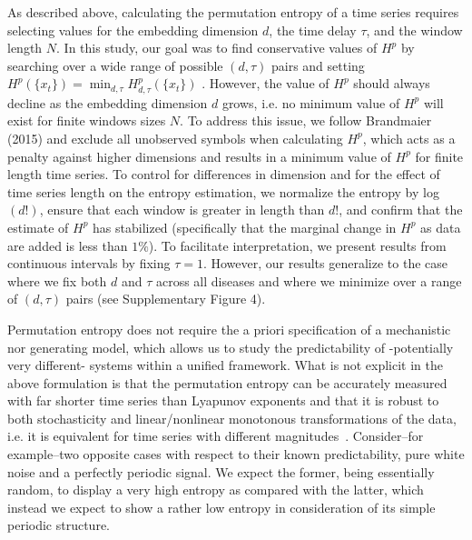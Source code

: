 \documentclass[fleqn,12pt]{wlscirep}
\begin{document}
As described above, calculating the permutation entropy of a time series requires selecting values for the embedding dimension $d$, the time delay $\tau$, and the window length $N$. In this study, our goal was to find conservative values of $H^p$ by searching over a wide range of possible $(d,\tau)$ pairs and setting $H^p (\{ x_t\}) = \min_{d,\tau} H^p_{d,\tau}(\{ x_t\})$ . However, the value of $H^p$ should always decline as the embedding dimension $d$ grows, i.e. no minimum value of $H^p$ will exist for finite windows sizes $N$.  To address this issue, we follow Brandmaier (2015) \cite{brandmaier2015pdc} and exclude all unobserved symbols when calculating $H^p$, which acts as a penalty against higher dimensions and results in a minimum value of $H^p$ for finite length time series.  To control for differences in dimension and for the effect of time series length on the entropy estimation, we normalize the entropy by log$(d!)$, ensure that each window is greater in length than $d!$, and confirm that the estimate of $H^p$ has stabilized (specifically that the marginal change in $H^p$ as data are added is less than $1\%$). To facilitate interpretation, we present results from continuous intervals by fixing $\tau=1$.  However, our results generalize to the case where we fix both $d$ and $\tau$ across all diseases and where we minimize over a range of $(d,\tau)$ pairs (see Supplementary Figure 4).

Permutation entropy does not require the a priori specification of a mechanistic nor generating model, which allows us to study the predictability of -potentially very different- systems within a unified framework. What is not explicit in the above formulation is that the permutation entropy can be accurately measured with far shorter time series than Lyapunov exponents and that it is robust to both stochasticity and linear\slash nonlinear monotonous transformations of the data, i.e. it is equivalent for time series with different magnitudes~\cite{bandt2002permutation,zunino2012distinguishing}. Consider--for example--two opposite cases with respect to their known predictability, pure white noise and a perfectly periodic signal. We expect the former, being essentially random, to display a very high entropy as compared with the latter, which instead we expect to show a rather low entropy in consideration of its simple periodic structure. 
\end{document}
